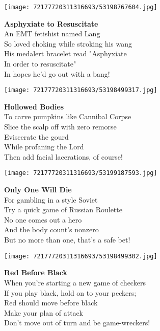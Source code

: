 \documentclass[10pt,letterpaper]{article}
\begin{document}
\begin{center}
\texttt{[image: 72177720311316693/53198767604.jpg]}
\end{center}

\begin{center}
\textbf{Asphyxiate to Resuscitate}\\
\vskip 0.2in
An EMT fetishist named Lang\\
So loved choking while stroking his wang\\
His medalert bracelet read "Asphyxiate\\
In order to resuscitate"\\
In hopes he'd go out with a bang!\\
\end{center}
\pagebreak

\begin{center}\texttt{[image: 72177720311316693/53198499317.jpg]}
\end{center}
\begin{center}
\textbf{Hollowed Bodies}\\
\vskip 0.2in
To carve pumpkins like Cannibal Corpse\\
Slice the scalp off with zero remorse\\
Eviscerate the gourd\\
While profaning the Lord\\
Then add facial lacerations, of course!\\
\end{center}
\pagebreak

\begin{center}\texttt{[image: 72177720311316693/53199187593.jpg]}
\end{center}
\begin{center}
\textbf{Only One Will Die}\\
\vskip 0.2in
For gambling in a style Soviet\\
Try a quick game of Russian Roulette\\
No one comes out a hero\\
And the body count's nonzero\\
But no more than one, that's a safe bet!\\
\end{center}
\pagebreak

\begin{center}\texttt{[image: 72177720311316693/53198499302.jpg]}
\end{center}
\begin{center}
\textbf{Red Before Black}\\
\vskip 0.2in
When you're starting a new game of checkers\\
If you play black, hold on to your peckers;\\
Red should move before black\\
Make your plan of attack\\
Don't move out of turn and be game-wreckers!\\
\end{center}
\pagebreak
\end{document}
